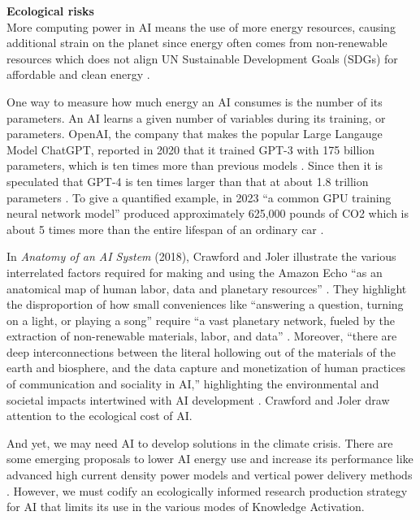 \noindent \textbf{Ecological risks}
\\
More computing power in AI means the use of more energy resources, causing additional strain on the planet since energy often comes from non-renewable resources which does not align UN Sustainable Development Goals (SDGs) for affordable and clean energy \citep{united_nations_sustainable_2024}. 

One way to measure how much energy an AI consumes is the number of its parameters. An AI learns a given number of variables during its training, or parameters. OpenAI, the company that makes the popular Large Langauge Model ChatGPT, reported in 2020 that it trained GPT-3 with 175 billion parameters, which is ten times more than previous models \citep[p. 1]{brown_language_2020}. Since then it is speculated that GPT-4 is ten times larger than that at about 1.8 trillion parameters \citep{schreiner_gpt-4_2023}. To give a quantified example, in 2023 “a common GPU training neural network model” produced approximately 625,000 pounds of CO2 which is about 5 times more than the entire lifespan of an ordinary car \citep[p. 1]{damkaci_studies_2023}. 

In \textit{Anatomy of an AI System} (2018), Crawford and Joler illustrate the various interrelated factors required for making and using the Amazon Echo “as an anatomical map of human labor, data and planetary resources” \citep{crawford_anatomy_2018}. They highlight the disproportion of how small conveniences like ``answering a question, turning on a light, or playing a song” require “a vast planetary network, fueled by the extraction of non-renewable materials, labor, and data” \citep{crawford_anatomy_2018}. Moreover, “there are deep interconnections between the literal hollowing out of the materials of the earth and biosphere, and the data capture and monetization of human practices of communication and sociality in AI,” highlighting the environmental and societal impacts intertwined with AI development \citep{crawford_anatomy_2018}. Crawford and Joler draw attention to the ecological cost of AI. 


And yet, we may need AI to develop solutions in the climate crisis. There are some emerging proposals to lower AI energy use and increase its performance like advanced high current density power models and vertical power delivery methods \citep[p. 1]{wood_high_2024}. However, we must codify an ecologically informed research production strategy for AI that limits its use in the various modes of Knowledge Activation.

